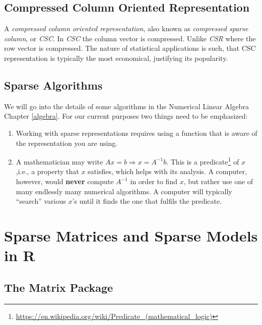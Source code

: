 \documentclass[]{book}
\renewcommand{\href}[2]{#2\footnote{\url{#1}}}
\theoremstyle{definition}
\theoremstyle{definition}
\theoremstyle{definition}
\theoremstyle{remark}
\begin{document}
\hypertarget{compressed-column-oriented-representation}{%
\subsection{Compressed Column Oriented Representation}\label{compressed-column-oriented-representation}}

A \emph{compressed column oriented representation}, also known as \emph{compressed sparse column}, or \emph{CSC}.
In \emph{CSC} the column vector is compressed. Unlike \emph{CSR} where the row vector is compressed.
The nature of statistical applications is such, that CSC representation is typically the most economical, justifying its popularity.

\hypertarget{sparse-algorithms}{%
\subsection{Sparse Algorithms}\label{sparse-algorithms}}

We will go into the details of some algorithms in the Numerical Linear Algebra Chapter \ref{algebra}.
For our current purposes two things need to be emphasized:

\begin{enumerate}
\def\labelenumi{\arabic{enumi}.}
\item
  Working with sparse representations requires using a function that is aware of the representation you are using.
\item
  A mathematician may write \(Ax=b \Rightarrow x=A^{-1}b\). This is a \href{https://en.wikipedia.org/wiki/Predicate_(mathematical_logic)}{predicate} of \(x\),i.e., a property that \(x\) satisfies, which helps with its analysis. A computer, however, would \textbf{never} compute \(A^{-1}\) in order to find \(x\), but rather use one of many endlessly many numerical algorithms. A computer will typically ``search'' various \(x\)'s until it finds the one that fulfils the predicate.
\end{enumerate}

\hypertarget{sparse-matrices-and-sparse-models-in-r}{%
\section{Sparse Matrices and Sparse Models in R}\label{sparse-matrices-and-sparse-models-in-r}}

\hypertarget{the-matrix-package}{%
\subsection{The Matrix Package}\label{the-matrix-package}}
\end{document}
